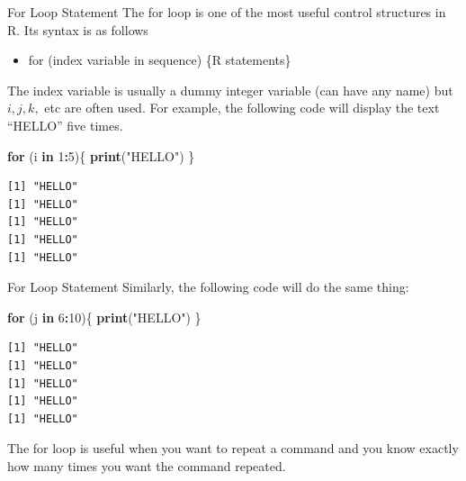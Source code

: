 \documentclass[
  ignorenonframetext,
]{beamer}
\newenvironment{Shaded}{\begin{snugshade}}{\end{snugshade}}
\newcommand{\ControlFlowTok}[1]{\textcolor[rgb]{0.13,0.29,0.53}{\textbf{#1}}}
\newcommand{\DecValTok}[1]{\textcolor[rgb]{0.00,0.00,0.81}{#1}}
\newcommand{\FunctionTok}[1]{\textcolor[rgb]{0.13,0.29,0.53}{\textbf{#1}}}
\newcommand{\NormalTok}[1]{#1}
\newcommand{\SpecialCharTok}[1]{\textcolor[rgb]{0.81,0.36,0.00}{\textbf{#1}}}
\newcommand{\StringTok}[1]{\textcolor[rgb]{0.31,0.60,0.02}{#1}}
\providecommand{\tightlist}{%
  \setlength{\itemsep}{0pt}\setlength{\parskip}{0pt}}
\begin{document}
\begin{frame}[fragile]{For Loop Statement}
\protect\hypertarget{for-loop-statement}{}
The for loop is one of the most useful control structures in R. Its
syntax is as follows

\begin{itemize}
\tightlist
\item
  for (index variable in sequence) \{R statements\}
\end{itemize}

The index variable is usually a dummy integer variable (can have any
name) but \(i, j, k,\) etc are often used. For example, the following
code will display the text ``HELLO'' five times.

\small

\begin{Shaded}
\begin{Highlighting}[]
\ControlFlowTok{for}\NormalTok{ (i }\ControlFlowTok{in} \DecValTok{1}\SpecialCharTok{:}\DecValTok{5}\NormalTok{)\{ }
  \FunctionTok{print}\NormalTok{(}\StringTok{"HELLO"}\NormalTok{) }
\NormalTok{\}}
\end{Highlighting}
\end{Shaded}

\begin{verbatim}
[1] "HELLO"
[1] "HELLO"
[1] "HELLO"
[1] "HELLO"
[1] "HELLO"
\end{verbatim}

\normalsize
\end{frame}

\begin{frame}[fragile]{For Loop Statement}
\protect\hypertarget{for-loop-statement-1}{}
Similarly, the following code will do the same thing:

\small

\begin{Shaded}
\begin{Highlighting}[]
\ControlFlowTok{for}\NormalTok{ (j }\ControlFlowTok{in} \DecValTok{6}\SpecialCharTok{:}\DecValTok{10}\NormalTok{)\{}
  \FunctionTok{print}\NormalTok{(}\StringTok{"HELLO"}\NormalTok{)}
\NormalTok{\}}
\end{Highlighting}
\end{Shaded}

\begin{verbatim}
[1] "HELLO"
[1] "HELLO"
[1] "HELLO"
[1] "HELLO"
[1] "HELLO"
\end{verbatim}

\normalsize

The for loop is useful when you want to repeat a command and you know
exactly how many times you want the command repeated.
\end{frame}
\end{document}
